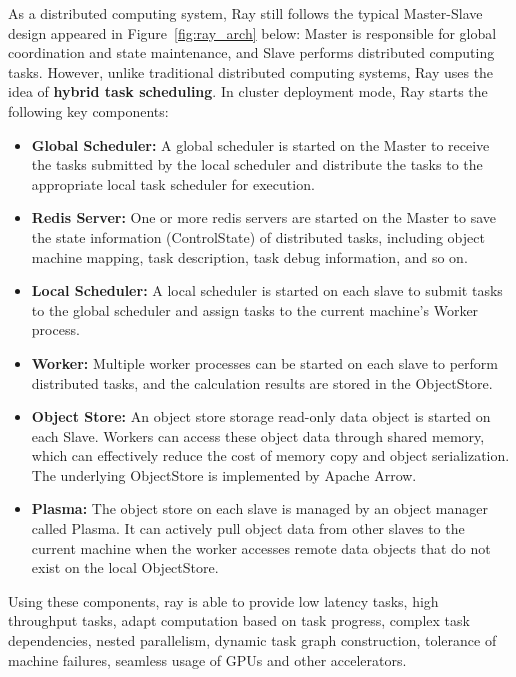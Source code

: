 As a distributed computing system, Ray still follows the typical Master-Slave design appeared in Figure~\ref{fig:ray_arch} below: Master is responsible for global coordination and state maintenance, and Slave performs distributed computing tasks. However, unlike traditional distributed computing systems, Ray uses the idea of \textbf{hybrid task scheduling}. In cluster deployment mode, Ray starts the following key components:

\begin{itemize}
	\item \textbf{Global Scheduler:} A global scheduler is started on the Master to receive the tasks submitted by the local scheduler and distribute the tasks to the appropriate local task scheduler for execution.
	\item \textbf{Redis Server:} One or more redis servers are started on the Master to save the state information (ControlState) of distributed tasks, including object machine mapping, task description, task debug information, and so on.
	\item \textbf{Local Scheduler:} A local scheduler is started on each slave to submit tasks to the global scheduler and assign tasks to the current machine's Worker process.
	\item \textbf{Worker:} Multiple worker processes can be started on each slave to perform distributed tasks, and the calculation results are stored in the ObjectStore.
	\item \textbf{Object Store:} An object store storage read-only data object is started on each Slave. Workers can access these object data through shared memory, which can effectively reduce the cost of memory copy and object serialization. The underlying ObjectStore is implemented by Apache Arrow.
	\item \textbf{Plasma:} The object store on each slave is managed by an object manager called Plasma. It can actively pull object data from other slaves to the current machine when the worker accesses remote data objects that do not exist on the local ObjectStore.
\end{itemize}

Using these components, ray is able to provide low latency tasks, high throughput tasks, adapt computation based on task progress, complex task dependencies, nested parallelism, dynamic task graph construction, tolerance of machine failures, seamless usage of GPUs and other accelerators.

